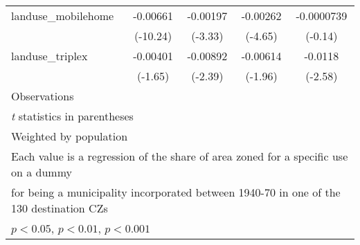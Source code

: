 \begin{table}[htbp]
\begin{tabular}{l*{4}{c}}
\addlinespace
landuse\_mobilehome  &    -0.00661\sym{***}&    -0.00197\sym{***}&    -0.00262\sym{***}&  -0.0000739         \\
                    &    (-10.24)         &     (-3.33)         &     (-4.65)         &     (-0.14)         \\
\addlinespace
landuse\_triplex     &    -0.00401         &    -0.00892\sym{*}  &    -0.00614\sym{*}  &     -0.0118\sym{**} \\
                    &     (-1.65)         &     (-2.39)         &     (-1.96)         &     (-2.58)         \\
\midrule
Observations        &                     &                     &                     &                     \\
\bottomrule
\multicolumn{5}{l}{\footnotesize \textit{t} statistics in parentheses}\\
\multicolumn{5}{l}{\footnotesize Weighted by population}\\
\multicolumn{5}{l}{\footnotesize Each value is a regression of the share of area zoned for a specific use on a dummy}\\
\multicolumn{5}{l}{\footnotesize for being a municipality incorporated between 1940-70 in one of the 130 destination CZs}\\
\multicolumn{5}{l}{\footnotesize \sym{*} \(p<0.05\), \sym{**} \(p<0.01\), \sym{***} \(p<0.001\)}\\
\end{tabular}
\end{table}
